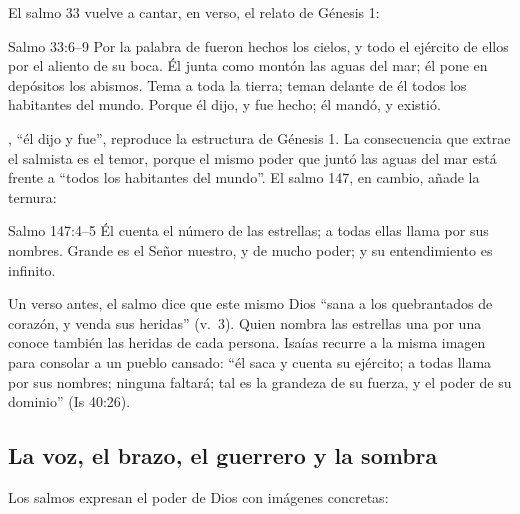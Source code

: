 El salmo 33 vuelve a cantar, en verso, el relato de Génesis 1:

\begin{verso}{Salmo 33:6–9}
Por la palabra de \SENOR{} fueron hechos los cielos, y todo el ejército de ellos por el aliento de su boca. Él junta como montón las aguas del mar; él pone en depósitos los abismos. Tema a \SENOR{} toda la tierra; teman delante de él todos los habitantes del mundo. Porque él dijo, y fue hecho; él mandó, y existió.
\end{verso}

, ``él dijo y fue'', reproduce la estructura de Génesis 1. La consecuencia que extrae el salmista es el temor, porque el mismo poder que juntó las aguas del mar está frente a ``todos los habitantes del mundo''. El salmo 147, en cambio, añade la ternura:

\begin{verso}{Salmo 147:4–5}
Él cuenta el número de las estrellas; a todas ellas llama por sus nombres. Grande es el Señor nuestro, y de mucho poder; y su entendimiento es infinito.
\end{verso}

Un verso antes, el salmo dice que este mismo Dios ``sana a los quebrantados de corazón, y venda sus heridas'' (v.~3). Quien nombra las estrellas una por una conoce también las heridas de cada persona. Isaías recurre a la misma imagen para consolar a un pueblo cansado: ``él saca y cuenta su ejército; a todas llama por sus nombres; ninguna faltará; tal es la grandeza de su fuerza, y el poder de su dominio'' (Is 40:26).

\subsection{La voz, el brazo, el guerrero y la sombra}

Los salmos expresan el poder de Dios con imágenes concretas:

